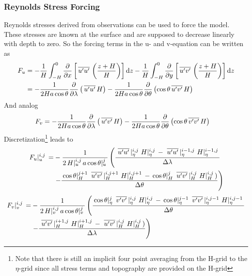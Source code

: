 \documentclass[a4paper]{article}
\begin{document}
\subsubsection{Reynolds Stress Forcing}
Reynolds stresses  derived from observations can be used to force the
model. These stresses are known at the surface and are supposed to decrease
linearly with depth to zero. So the forcing terms in the u- and v-equation can
be written as
\begin{equation}
  \begin{split}
    F_u&=-\frac1H\int_{-H}^0\frac{\partial {}}{\partial {x}}\left[\,\overline{{u}'{u}'}\,\left(\frac{z+H}H\right)\right]{\rm d}
    z -
    \frac1H\int_{-H}^0\frac{\partial {}}{\partial {y}}\left[\,\overline{{u}'{v}'}\,\left(\frac{z+H}H\right)\right]{\rm d}
    z\\
    &=-\frac1{2Ha\cos\theta}\frac{\partial {}}{\partial {\lambda}}\left(\,\overline{{u}'{u}'}\,H\right)-\frac1{2Ha\cos\theta}\frac{\partial {}}{\partial {\theta}}\left(\cos\theta\,\overline{{u}'{v}'}\,H\right)
  \end{split}
\end{equation}
And analog
\begin{equation}
  \begin{split}
    F_v&=-\frac1{2Ha\cos\theta}\frac{\partial {}}{\partial {\lambda}}\left(\,\overline{{u}'{v}'}\,H\right)-\frac1{2Ha\cos\theta}\frac{\partial {}}{\partial {\theta}}\left(\cos\theta\,\overline{{v}'{v}'}\,H\right)
  \end{split}
\end{equation}
Discretization\footnote{Note that there is still an implicit four point
  averaging from the H-grid to the $\eta$-grid since all stress terms and topography are
  provided on the H-grid} leads to
\begin{equation}
  \begin{split}
    \,{F_u}\vert_{u}^{{i},{j}}\,=&-\frac1{2\,{H}\vert_{u}^{{i},{j}}\,a\,{\cos\theta}\vert_{u}^{{j}}\,}\left(\frac{\,{\,\overline{{u}'{u}'}\,}\vert_{\eta}^{{i},{j}}\,\,{H}\vert_{\eta}^{{i},{j}}\,-\,{\,\overline{{u}'{u}'}\,}\vert_{\eta}^{{i-1},{j}}\,\,{H}\vert_{\eta}^{{i-1},{j}}\,}{\Delta\lambda}\right.\\
&\left.-\frac{\,{\cos\theta}\vert_{H}^{{j+1}}\,\,{\,\overline{{u}'{v}'}\,}\vert_{H}^{{i},{j+1}}\,\,{H}\vert_{H}^{{i},{j+1}}\,-\,{\cos\theta}\vert_{H}^{{j}}\,\,{\,\overline{{u}'{v}'}\,}\vert_{H}^{{i},{j}}\,\,{H}\vert_{H}^{{i},{j}}\,)}{\Delta\theta}\right)
  \end{split}
\end{equation}
\begin{equation}
  \begin{split}
    \,{F_v}\vert_{v}^{{i},{j}}\,=&-\frac1{2\,{H}\vert_{v}^{{i},{j}}\,a\,{\cos\theta}\vert_{v}^{{j}}\,}\left(\frac{\,{\cos\theta}\vert_{\eta}^{{j}}\,\,{\,\overline{{v}'{v}'}\,}\vert_{\eta}^{{i},{j}}\,\,{H}\vert_{\eta}^{{i},{j}}\,-\,{\cos\theta}\vert_{\eta}^{{j-1}}\,\,{\,\overline{{v}'{v}'}\,}\vert_{\eta}^{{i},{j-1}}\,\,{H}\vert_{\eta}^{{i},{j-1}}\,}{\Delta\theta}\right.\\
&\left.-\frac{\,{\,\overline{{u}'{v}'}\,}\vert_{H}^{{i+1},{j}}\,\,{H}\vert_{H}^{{i+1},{j}}\,-\,{\,\overline{{u}'{v}'}\,}\vert_{H}^{{i},{j}}\,\,{H}\vert_{H}^{{i},{j}}\,)}{\Delta\lambda}\right)
  \end{split}
\end{equation}
\end{document}
